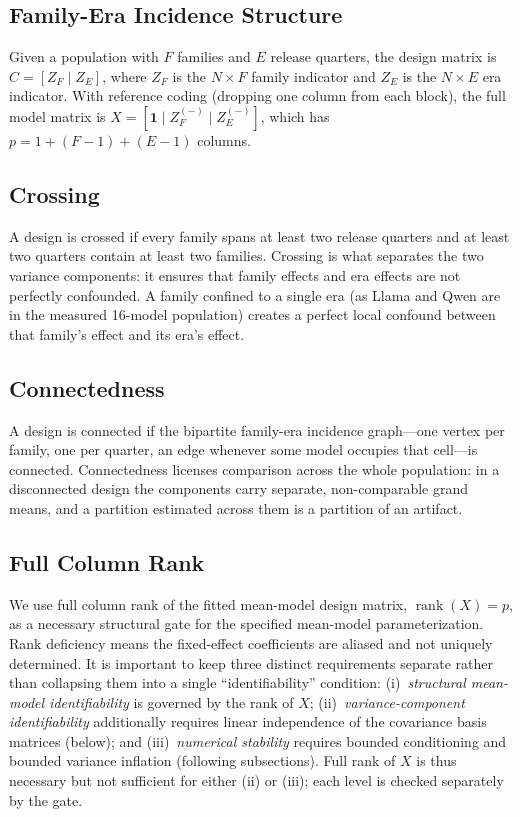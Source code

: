 \documentclass[11pt]{article}
\theoremstyle{definition}
\theoremstyle{plain}
\begin{document}
\subsection{Family-Era Incidence Structure}
Given a population with $F$ families and $E$ release quarters, the design matrix is $C = [Z_F \mid Z_E]$, where $Z_F$ is the $N \times F$ family indicator and $Z_E$ is the $N \times E$ era indicator. With reference coding (dropping one column from each block), the full model matrix is $X = [\mathbf{1} \mid Z_F^{(-)} \mid Z_E^{(-)}]$, which has $p = 1 + (F-1) + (E-1)$ columns.

\subsection{Crossing}
A design is crossed if every family spans at least two release quarters and at least two quarters contain at least two families. Crossing is what separates the two variance components: it ensures that family effects and era effects are not perfectly confounded. A family confined to a single era (as Llama and Qwen are in the measured 16-model population) creates a perfect local confound between that family's effect and its era's effect.

\subsection{Connectedness}
A design is connected if the bipartite family-era incidence graph---one vertex per family, one per quarter, an edge whenever some model occupies that cell---is connected. Connectedness licenses comparison across the whole population: in a disconnected design the components carry separate, non-comparable grand means, and a partition estimated across them is a partition of an artifact.

\subsection{Full Column Rank}
We use full column rank of the fitted mean-model design matrix, $\operatorname{rank}(X) = p$, as a necessary structural gate for the specified mean-model parameterization. Rank deficiency means the fixed-effect coefficients are aliased and not uniquely determined. It is important to keep three distinct requirements separate rather than collapsing them into a single ``identifiability'' condition: (i)~\emph{structural mean-model identifiability} is governed by the rank of $X$; (ii)~\emph{variance-component identifiability} additionally requires linear independence of the covariance basis matrices (below); and (iii)~\emph{numerical stability} requires bounded conditioning and bounded variance inflation (following subsections). Full rank of $X$ is thus necessary but not sufficient for either (ii) or (iii); each level is checked separately by the gate.
\end{document}
